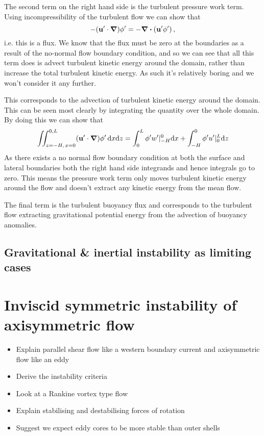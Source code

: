     The second term on the right hand side is the turbulent pressure work term. Using incompressibility of the turbulent flow we can show that
    \begin{equation}
       - (\mathbf{u}'\cdot \grad) \phi ' = - \div{(\mathbf{u'}\phi ')} \, ,
    \end{equation}
    i.e. this is a flux. We know that the flux must be zero at the boundaries as a result of the no-normal flow boundary condition, and so we can see that all this term does is advect turbulent kinetic energy around the domain, rather than increase the total turbulent kinetic energy. As such it's relatively boring and we won't consider it any further.
    
    This corresponds to the advection of turbulent kinetic energy around the domain. This can be seen most clearly by integrating the quantity over the whole domain. By doing this we can show that
    \begin{equation}
        \iint^{0, L}_{z = -H,\, x = 0 } (\mathbf{u'} \cdot \grad ) \phi '\, \dd x \dd z = \int_0^L \phi' w' \rvert ^0_{-H} \dd x + \int_{-H}^0 \phi' u' \rvert^L_0 \dd z
    \end{equation}
    As there exists a no normal flow boundary condition at both the surface and lateral boundaries both the right hand side integrands and hence integrals go to zero. This means the pressure work term only moves turbulent kinetic energy around the flow and doesn't extract any kinetic energy from the mean flow.
    
    The final term is the turbulent buoyancy flux and corresponds to the turbulent flow extracting gravitational potential energy from the advection of buoyancy anomalies.

\subsection{Gravitational \& inertial instability as limiting cases}

\section{Inviscid symmetric instability of axisymmetric flow}
\begin{itemize}
    \item Explain parallel shear flow like a western boundary current and axisymmetric flow like an eddy
    \item Derive the instability criteria
    \item Look at a Rankine vortex type flow
    \item Explain stabilising and destabilising forces of rotation
    \item Suggest we expect eddy cores to be more stable than outer shells
\end{itemize}

